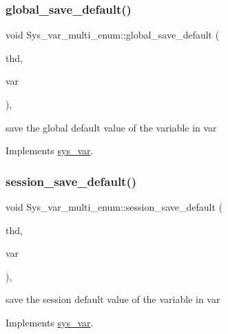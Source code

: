 \subsubsection{\texorpdfstring{global\+\_\+save\+\_\+default()}{global\_save\_default()}}
{\footnotesize\ttfamily void Sys\+\_\+var\+\_\+multi\+\_\+enum\+::global\+\_\+save\+\_\+default (\begin{DoxyParamCaption}\item[{T\+HD $\ast$}]{thd,  }\item[{\mbox{\hyperlink{classset__var}{set\+\_\+var}} $\ast$}]{var }\end{DoxyParamCaption})\hspace{0.3cm}{\ttfamily [inline]}, {\ttfamily [virtual]}}

save the global default value of the variable in var 

Implements \mbox{\hyperlink{classsys__var}{sys\+\_\+var}}.

\mbox{\label{classSys__var__multi__enum_a0590426cff9c64e48b5edef6791f218e}} 
\subsubsection{\texorpdfstring{session\+\_\+save\+\_\+default()}{session\_save\_default()}}
{\footnotesize\ttfamily void Sys\+\_\+var\+\_\+multi\+\_\+enum\+::session\+\_\+save\+\_\+default (\begin{DoxyParamCaption}\item[{T\+HD $\ast$}]{thd,  }\item[{\mbox{\hyperlink{classset__var}{set\+\_\+var}} $\ast$}]{var }\end{DoxyParamCaption})\hspace{0.3cm}{\ttfamily [inline]}, {\ttfamily [virtual]}}

save the session default value of the variable in var 

Implements \mbox{\hyperlink{classsys__var}{sys\+\_\+var}}.

\mbox{\label{classSys__var__multi__enum_a70b21626366df65d6fa0b43b7d89b594}} 
